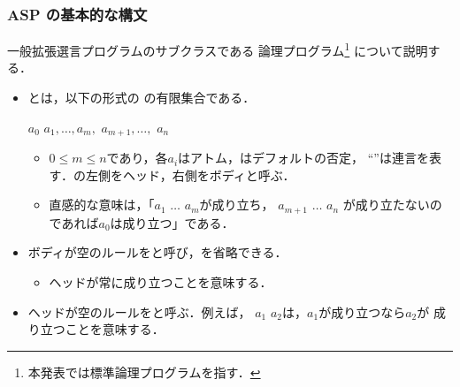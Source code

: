\documentclass[dvipdfmx,11pt]{beamer}
\begin{document}
\begin{frame}\frametitle{ASP の基本的な構文}

  一般拡張選言プログラムのサブクラスである
  論理プログラム\footnote{本発表では標準論理プログラムを指す．}
  について説明する．

  \begin{itemize}
    \item {}とは，以下の形式の
          の有限集合である．
          \begin{block}{}
            \centering
            $a_0$ \code{:-} $a_1, \dots, a_m,$  $a_{m+1}, \dots,$  $a_{n}$
          \end{block}
          \begin{itemize}
            \item $0 \le m \le n$であり，各$a_i$はアトム，はデフォルトの否定，
                  ``\code{,}''は連言を表す．\code{:-}の左側をヘッド，右側をボディと呼ぶ．
            \item 直感的な意味は，「$a_1$ \code{,} $\dots$ \code{,} $a_m$が成り立ち，
                  $a_{m+1}$ \code{,} $\dots$ \code{,} $a_{n}$
                  が成り立たないのであれば$a_{0}$は成り立つ」である．
          \end{itemize}       
    \item ボディが空のルールをと呼び，\code{:-}を省略できる．
          \begin{itemize}
            \item ヘッドが常に成り立つことを意味する．
          \end{itemize}
    \item ヘッドが空のルールをと呼ぶ．例えば，
          \code{:-} $a_1$  $a_2$は，$a_1$が成り立つなら$a_2$が
          成り立つことを意味する．
  \end{itemize}
  
\end{frame}
\end{document}
